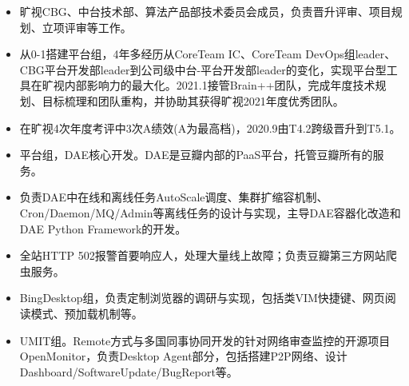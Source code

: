 \documentclass{resume}
\begin{document}
\begin{itemize}
  \item 旷视CBG、中台技术部、算法产品部技术委员会成员，负责晋升评审、项目规划、立项评审等工作。
	\item 从0-1搭建平台组，4年多经历从CoreTeam IC、CoreTeam DevOps组leader、CBG平台开发部leader到公司级中台-平台开发部leader的变化，实现平台型工具在旷视内部影响力的最大化。2021.1接管Brain++团队，完成年度技术规划、目标梳理和团队重构，并协助其获得旷视2021年度优秀团队。
	\item 在旷视4次年度考评中3次A绩效(A为最高档)，2020.9由T4.2跨级晋升到T5.1。
\end{itemize}

\begin{itemize}
  \item 平台组，DAE核心开发。DAE是豆瓣内部的PaaS平台，托管豆瓣所有的服务。
  \item 负责DAE中在线和离线任务AutoScale调度、集群扩缩容机制、Cron/Daemon/MQ/Admin等离线任务的设计与实现，主导DAE容器化改造和DAE Python Framework的开发。
  \item 全站HTTP 502报警首要响应人，处理大量线上故障；负责豆瓣第三方网站爬虫服务。
\end{itemize}

\begin{itemize}
  \item BingDesktop组，负责定制浏览器的调研与实现，包括类VIM快捷键、网页阅读模式、预加载机制等。
\end{itemize}

\begin{itemize}
  \item UMIT组。Remote方式与多国同事协同开发的针对网络审查监控的开源项目OpenMonitor，负责Desktop Agent部分，包括搭建P2P网络、设计Dashboard/SoftwareUpdate/BugReport等。
\end{itemize}
\end{document}
